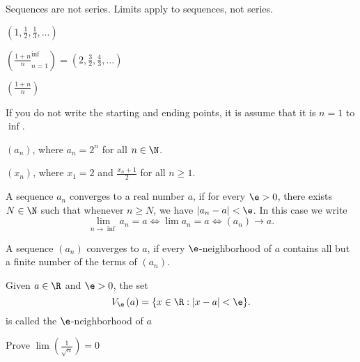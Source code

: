 Sequences are not series. Limits apply to sequences, not series.

\begin{eg}
	$\left( 1, \frac{1}{2}, \frac{1}{3}, \ldots \right) $
\end{eg}

\begin{eg}
	$\left( \frac{1+n}{n}_{n=1}^{\inf} \right) = \left( 2, \frac{3}{2}, \frac{4}{3}, \ldots \right) $	
\end{eg}

\begin{eg}
	$\left( \frac{1+n}{n} \right) $ 

	If you do not write the starting and ending points, it is assume that it is $n=1$ to $\inf$.
\end{eg}

\begin{eg}
	$\left( a_n \right) $, where $a_n = 2^{n}$ for all $n \in \N$.
\end{eg}

\begin{eg}
	$\left( x_n \right)$, where $x_1 = 2$ and $\frac{x_n + 1}{2 }$ for all $n \ge 1$.
\end{eg}

\begin{definition}
	A sequence $a_n$ converges to a real number $a$, if for every $\e > 0$, there exists $N \in \N$ such that whenever $n \ge N$, we have $\left|a_n - a\right| < \e$. In this case we write
	\[
		\lim_{n \to \inf} a_n = a \iff \lim a_n = a \iff \left( a_n \right) \to a
	.\] 
\end{definition}

\begin{definition}
	A sequence $\left( a_n \right) $ converges to $a$, if every $\e$-neighborhood of $a$ contains all but a finite number of the terms of $\left( a_n \right) $.
\end{definition}

\begin{definition}
	Given $a \in \R$ and $\e > 0$, the set
	\[
		V_\e\left( a \right) = \{x \in \R : \left|x - a\right| < \e\} 
	.\] 
	is called the $\e$-neighborhood of $a$
\end{definition}

\begin{eg}
	Prove $\lim\left( \frac{1}{\sqrt{n}} \right) = 0$
\end{eg}

